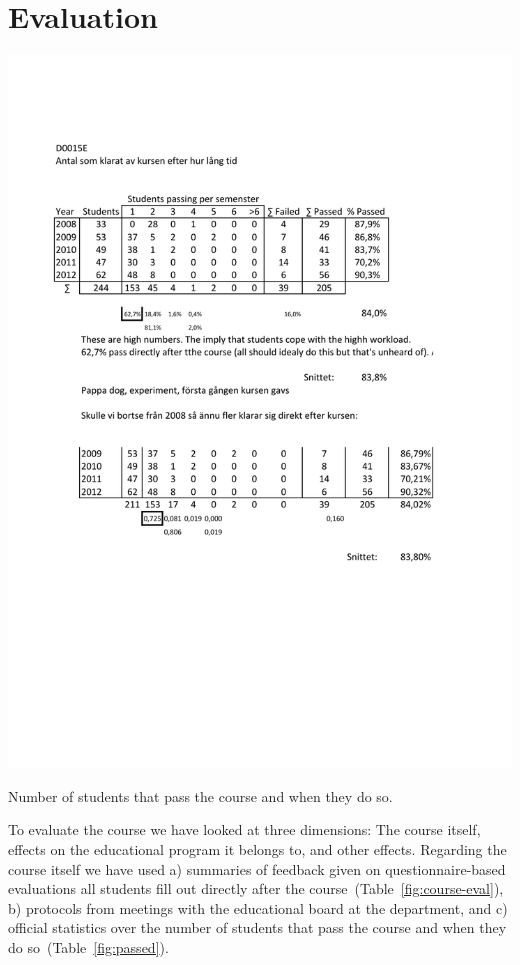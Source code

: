 \documentclass[conference]{IEEEtran}
\begin{document}
\section{Evaluation}

\begin{table}[!t]
  \centering
  \includegraphics[width=\columnwidth]{passed}
  \caption{Number of students that pass the course and when they do so.}
  \label{fig:passed}
\end{table}

To evaluate the course we have looked at three dimensions: The course itself, effects on the educational program it belongs to, and other effects. Regarding the course itself we have used a) summaries of feedback given on questionnaire-based evaluations all students fill out directly after the course~(Table~\ref{fig:course-eval}), b) protocols from meetings with the educational board at the department, and c) official statistics over the number of students that pass the course and when they do so~(Table~\ref{fig:passed}). 
\end{document}
